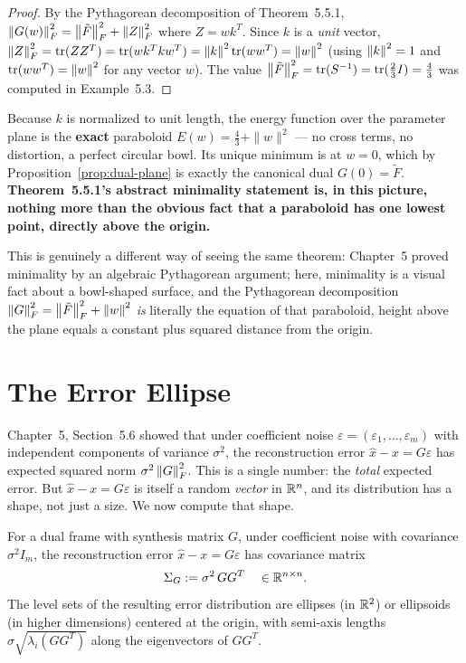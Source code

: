 \begin{proof}
By the Pythagorean decomposition of Theorem~5.5.1,
$\left\| G(w) \right\|_F^2=\left\| \tilde F \right\|_F^2+\left\| Z \right\|_F^2$ where $Z=wk^T$. Since
$k$ is a \emph{unit} vector, $\left\| Z \right\|_F^2=\operatorname{tr}(Z Z^T)=\operatorname{tr}(wk^Tkw^T)
=\left\| k \right\|^2\operatorname{tr}(ww^T)=\left\| w \right\|^2$ (using $\left\| k \right\|^2=1$ and
$\operatorname{tr}(ww^T)=\left\| w \right\|^2$ for any vector $w$). The value
$\left\| \tilde F \right\|_F^2=\operatorname{tr}(S^{-1})=\operatorname{tr}(\tfrac23I)=\tfrac43$ was computed in
Example~5.3.
\end{proof}

\begin{keyidea}
Because $k$ is normalized to unit length, the energy function over the
parameter plane is the \textbf{exact} paraboloid $E(w)=\tfrac43+\|w\|^2$
--- no cross terms, no distortion, a perfect circular bowl. Its unique
minimum is at $w=0$, which by Proposition~\ref{prop:dual-plane} is
exactly the canonical dual $G(0)=\tilde F$. \textbf{Theorem~5.5.1's
abstract minimality statement is, in this picture, nothing more than
the obvious fact that a paraboloid has one lowest point, directly
above the origin.}
\end{keyidea}

This is genuinely a different way of seeing the same theorem: Chapter~5
proved minimality by an algebraic Pythagorean argument; here, minimality
is a visual fact about a bowl-shaped surface, and the Pythagorean
decomposition $\left\| G \right\|_F^2=\left\| \tilde F \right\|_F^2+\left\| w \right\|^2$ \emph{is}
literally the equation of that paraboloid, height above the plane equals
a constant plus squared distance from the origin.

\section{The Error Ellipse}
\label{sec:error-ellipse}

Chapter~5, Section~5.6 showed that under coefficient noise
$\varepsilon=(\varepsilon_1,\ldots,\varepsilon_m)$ with independent
components of variance $\sigma^2$, the reconstruction error
$\hat x - x = G\varepsilon$ has expected squared norm
$\sigma^2\left\| G \right\|_F^2$. This is a single number: the \emph{total}
expected error. But $\hat x-x=G\varepsilon$ is itself a random
\emph{vector} in $\mathbb{R}^n$, and its distribution has a shape, not just a
size. We now compute that shape.

\begin{definition}
\label{def:error-covariance}
For a dual frame with synthesis matrix $G$, under coefficient noise with
covariance $\sigma^2I_m$, the reconstruction error $\hat x-x=G\varepsilon$
has covariance matrix
\[
  \Sigma_G := \sigma^2\, GG^T \quad\in\mathbb{R}^{n\times n}.
\]
The level sets of the resulting error distribution are ellipses
(in $\mathbb{R}^2$) or ellipsoids (in higher dimensions) centered at the origin,
with semi-axis lengths $\sigma\sqrt{\lambda_i(GG^T)}$ along the
eigenvectors of $GG^T$.
\end{definition}

